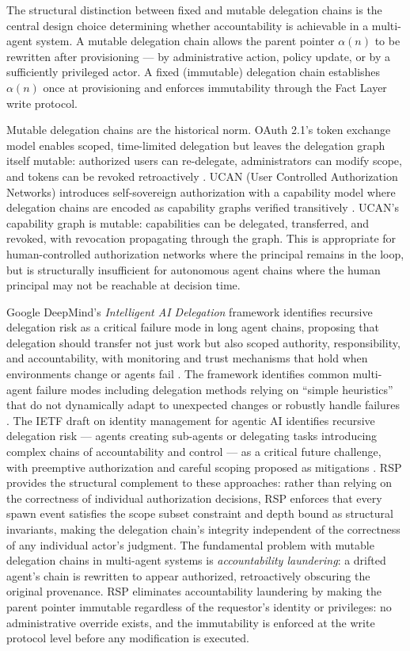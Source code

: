 The structural distinction between fixed and mutable delegation chains is the central design choice determining whether accountability is achievable in a multi-agent system. A mutable delegation chain allows the parent pointer $\alpha(n)$ to be rewritten after provisioning --- by administrative action, policy update, or by a sufficiently privileged actor. A fixed (immutable) delegation chain establishes $\alpha(n)$ once at provisioning and enforces immutability through the Fact Layer write protocol.

Mutable delegation chains are the historical norm. OAuth 2.1's token exchange model enables scoped, time-limited delegation but leaves the delegation graph itself mutable: authorized users can re-delegate, administrators can modify scope, and tokens can be revoked retroactively \cite{UCAN}. UCAN (User Controlled Authorization Networks) introduces self-sovereign authorization with a capability model where delegation chains are encoded as capability graphs verified transitively \cite{UCAN}. UCAN's capability graph is mutable: capabilities can be delegated, transferred, and revoked, with revocation propagating through the graph. This is appropriate for human-controlled authorization networks where the principal remains in the loop, but is structurally insufficient for autonomous agent chains where the human principal may not be reachable at decision time.

Google DeepMind's \emph{Intelligent AI Delegation} framework identifies recursive delegation risk as a critical failure mode in long agent chains, proposing that delegation should transfer not just work but also scoped authority, responsibility, and accountability, with monitoring and trust mechanisms that hold when environments change or agents fail \cite{arxiv-intelligent-delegation}. The framework identifies common multi-agent failure modes including delegation methods relying on ``simple heuristics'' that do not dynamically adapt to unexpected changes or robustly handle failures \cite{arxiv-intelligent-delegation}. The IETF draft on identity management for agentic AI identifies recursive delegation risk --- agents creating sub-agents or delegating tasks introducing complex chains of accountability and control --- as a critical future challenge, with preemptive authorization and careful scoping proposed as mitigations \cite{openid-agentic-ai}. RSP provides the structural complement to these approaches: rather than relying on the correctness of individual authorization decisions, RSP enforces that every spawn event satisfies the scope subset constraint and depth bound as structural invariants, making the delegation chain's integrity independent of the correctness of any individual actor's judgment. The fundamental problem with mutable delegation chains in multi-agent systems is \emph{accountability laundering}: a drifted agent's chain is rewritten to appear authorized, retroactively obscuring the original provenance. RSP eliminates accountability laundering by making the parent pointer immutable regardless of the requestor's identity or privileges: no administrative override exists, and the immutability is enforced at the write protocol level before any modification is executed.


